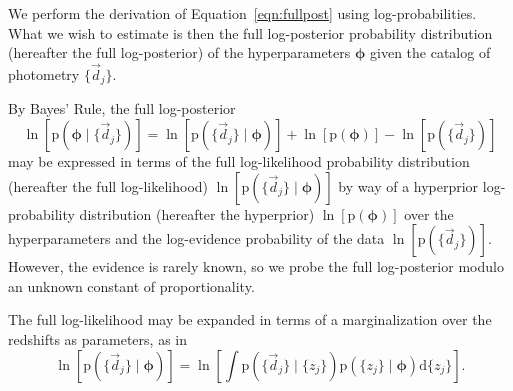 \documentclass[iop]{emulateapj}
\newcommand{\Eq}[1]{Equation~\ref{#1}}
\newcommand{\data}{\ensuremath{\vec{d}}}%
\newcommand{\pr}[1]{\ensuremath{\mathrm{p}(#1)}}%
\newcommand{\gvn}{\mid}%
\newcommand{\integral}[2]{\ensuremath{\int #1 \mathrm{d} #2}}
\newcommand{\bvec}[1]{\ensuremath{\boldsymbol{#1}}}%
\newcommand{\ndphi}{\bvec{\phi}}
\begin{document}
We perform the derivation of \Eq{eqn:fullpost} using log-probabilities.
What we wish to estimate is then the full log-posterior probability distribution (hereafter the full log-posterior) of the hyperparameters $\ndphi$ given the catalog of photometry $\{\data_{j}\}$.

By Bayes' Rule, the full log-posterior
\begin{equation}
\label{eqn:basicbayes}
\ln[\pr{\ndphi \gvn \{\data_{j}\}}] = \ln[\pr{\{\data_{j}\} \gvn \ndphi}] + \ln[\pr{\ndphi}] - \ln[\pr{\{\data_{j}\}}]
\end{equation}
may be expressed in terms of the full log-likelihood probability distribution (hereafter the full log-likelihood) $\ln[\pr{\{\data_{j}\} \gvn \ndphi}]$ by way of a hyperprior log-probability distribution (hereafter the hyperprior) $\ln[\pr{\ndphi}]$ over the hyperparameters and the log-evidence probability of the data $\ln[\pr{\{\data_{j}\}}]$.
However, the evidence is rarely known, so we probe the full log-posterior modulo an unknown constant of proportionality.

The full log-likelihood may be expanded in terms of a marginalization over the redshifts as parameters, as in
\begin{equation}
\label{eqn:marginalize}
\ln[\pr{\{\data_{j}\} \gvn \ndphi}] = \ln\left[\integral{\pr{\{\data_{j}\} \gvn \{z_{j}\}} \pr{\{z_{j}\} \gvn \ndphi}}{\{z_{j}\}}\right].
\end{equation}
\end{document}
